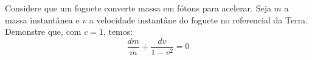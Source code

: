 Considere que um foguete converte massa em fótons para acelerar. Seja $m$ a massa instantânea e $v$ a velocidade instantâne do foguete no referencial da Terra. Demonstre que, com $c = 1$, temos: %
\[ \frac{dm}{m} + \frac{dv}{1 - v^2} = 0 \]
